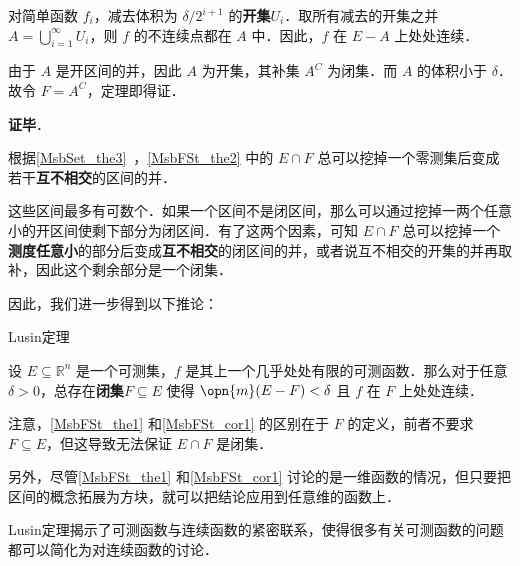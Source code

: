 对简单函数 $f_i$，减去体积为 $\delta/2^{i+1}$ 的\textbf{开集}$U_i$．取所有减去的开集之并 $A=\bigcup_{i=1}^\infty U_i$，则 $f$ 的不连续点都在 $A$ 中．因此，$f$ 在 $E-A$ 上处处连续．

由于 $A$ 是开区间的并，因此 $A$ 为开集，其补集 $A^C$ 为闭集．而 $A$ 的体积小于 $\delta$．故令 $F=A^C$，定理即得证．

\textbf{证毕}．

根据\autoref{MsbSet_the3}~，\autoref{MsbFSt_the2} 中的 $E\cap F$ 总可以挖掉一个零测集后变成若干\textbf{互不相交}的区间的并．

这些区间最多有可数个．如果一个区间不是闭区间，那么可以通过挖掉一两个任意小的开区间使剩下部分为闭区间．有了这两个因素，可知 $E\cap F$ 总可以挖掉一个\textbf{测度任意小}的部分后变成\textbf{互不相交}的闭区间的并，或者说互不相交的开集的并再取补，因此这个剩余部分是一个闭集．

因此，我们进一步得到以下推论：

\begin{corollary}{Lusin定理}\label{MsbFSt_cor1}

设 $E\subseteq\mathbb{R}^n$ 是一个可测集，$f$ 是其上一个几乎处处有限的可测函数．那么对于任意 $\delta>0$，总存在\textbf{闭集}$F\subseteq E$ 使得 $\opn{m}(E-F)<\delta$ 且 $f$ 在 $F$ 上处处连续．

\end{corollary}

注意，\autoref{MsbFSt_the1} 和\autoref{MsbFSt_cor1} 的区别在于 $F$ 的定义，前者不要求 $F\subseteq E$，但这导致无法保证 $E\cap F$ 是闭集．

另外，尽管\autoref{MsbFSt_the1} 和\autoref{MsbFSt_cor1} 讨论的是一维函数的情况，但只要把区间的概念拓展为方块，就可以把结论应用到任意维的函数上．

Lusin定理揭示了可测函数与连续函数的紧密联系，使得很多有关可测函数的问题都可以简化为对连续函数的讨论．















